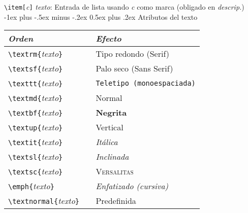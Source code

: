 \documentclass[10pt,landscape,a4paper]{article}
\makeatletter
\renewcommand{\section}{\@startsection{section}{1}{0mm}%
                                {-1ex plus -.5ex minus -.2ex}%
                                {0.5ex plus .2ex}%
                                {\normalfont\large\bfseries}}
\renewcommand{\subsection}{\@startsection{subsection}{2}{0mm}%
                                {-1explus -.5ex minus -.2ex}%
                                {0.5ex plus .2ex}%
                                {\normalfont\normalsize\bfseries}}
\makeatother
\begin{document}
\begin{multicols}{3}
\verb!\item[!\emph{c}\verb!]! \emph{texto}: Entrada de lista usando \emph{c} como marca (obligado en \emph{descrip.})\\




\section{Atributos del texto}


\newcommand{\FontCmd}[3]{\PBS\verb!\#1{!\emph{texto}\verb!}!  \> %
                         \verb!{\#2 !\emph{texto}\verb!}! \> %
                         \#1{#3}}
\begin{tabular}{@{}l@{}l@{}}
\emph{Orden}  & \emph{Efecto} \\ \hline
\verb!\textrm{!\emph{texto}\verb!}! &\textrm{Tipo redondo (Serif)} \\
\verb!\textsf{!\emph{texto}\verb!}! & \textsf{Palo seco (Sans Serif)} \\
\verb!\texttt{!\emph{texto}\verb!}! & \texttt{Teletipo (monoespaciada)} \\
\verb!\textmd{!\emph{texto}\verb!}! & \textmd{Normal} \\
\verb!\textbf{!\emph{texto}\verb!}! & \textbf{Negrita} \\
\verb!\textup{!\emph{texto}\verb!}! & \textup{Vertical} \\
\verb!\textit{!\textit{texto}\verb!}!& \emph{Itálica} \\
\verb!\textsl{!\emph{texto}\verb!}! & \textsl{Inclinada} \\
\verb!\textsc{!\emph{texto}\verb!}! & \textsc{Versalitas} \\
\verb!\emph{!\emph{texto}\verb!}!  & \emph{Enfatizado (cursiva)} \\
\verb!\textnormal{!\emph{texto}\verb!}  ! & \textnormal{Predefinida} \\[0.7mm]
\end{tabular}


\end{multicols}
\end{document}
